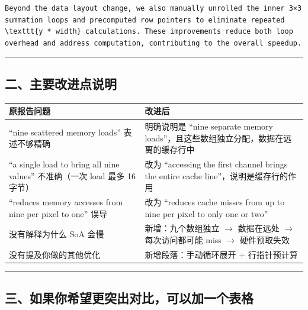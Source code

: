 \documentclass[11pt, a4paper]{article}
\begin{document}
\begin{aibox}
\begin{tcolorbox}[colback=white,colframe=gray!50!white,boxrule=0.5pt,arc=2pt,left=5pt,right=5pt,top=5pt,bottom=5pt]
\begin{verbatim}
Beyond the data layout change, we also manually unrolled the inner 3×3 
summation loops and precomputed row pointers to eliminate repeated 
\texttt{y * width} calculations. These improvements reduce both loop 
overhead and address computation, contributing to the overall speedup.
\end{verbatim}
\end{tcolorbox}

\begin{center}\rule{\textwidth}{0.4pt}\end{center}

\subsection*{二、主要改进点说明}

\begin{tcolorbox}[colback=white,colframe=gray!50!white,boxrule=0.5pt,arc=2pt,left=5pt,right=5pt,top=5pt,bottom=5pt]
\vspace{0.5em}
\begin{tabularx}{\textwidth}{@{} p{} X @{}}
\toprule
原报告问题 & 改进后 \\
\midrule
``nine scattered memory loads'' 表述不够精确 & 明确说明是 ``nine separate memory loads''，且这些数组独立分配，数据在远离的缓存行中 \\
``a single load to bring all nine values'' 不准确（一次 load 最多 16 字节） & 改为 ``accessing the first channel brings the entire cache line''，说明是缓存行的作用 \\
``reduces memory accesses from nine per pixel to one'' 误导 & 改为 ``reduces cache misses from up to nine per pixel to only one or two'' \\
没有解释为什么 SoA 会慢 & 新增：九个数组独立 $\to$ 数据在远处 $\to$ 每次访问都可能 miss $\to$ 硬件预取失效 \\
没有提及你做的其他优化 & 新增段落：手动循环展开 + 行指针预计算 \\
\bottomrule
\end{tabularx}
\vspace{0.5em}
\end{tcolorbox}

\begin{center}\rule{\textwidth}{0.4pt}\end{center}

\subsection*{三、如果你希望更突出对比，可以加一个表格}


\end{aibox}
\end{document}
